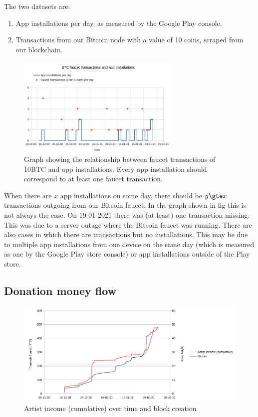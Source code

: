 The two datasets are: 
\begin{enumerate}
    \item App installations per day, as measured by the Google Play console.
    \item Transactions from our Bitcoin node with a value of 10 coins, scraped from our blockchain.
\end{enumerate}

\begin{figure}
    \centering
    \includegraphics[width=0.7\textwidth]{evaluation/faucet-app-installs.png}
    \caption{Graph showing the relationship between faucet transactions of 10BTC and app installations. Every app installation should correspond to at least one faucet transaction.}
    \label{fig:faucet-app-installs}
\end{figure}
When there are $x$ app installations on some day, there should be $y \gte x$ transactions outgoing from our Bitcoin faucet. In the graph shown in fig this is not always the case. On 19-01-2021 there was (at least) one transaction missing. This was due to a server outage where the Bitcoin faucet was running. There are also cases in which there are transactions but no installations. This may be due to multiple app installations from one device on the same day (which is measured as one by the Google Play store console) or app installations outside of the Play store. 

\subsection{Donation money flow}
\begin{figure}
    \centering
    \includegraphics[width=1\textwidth]{evaluation/artist-income.png}
    \caption{Artist income (cumulative) over time and block creation}
    \label{fig:artist-income}
\end{figure}

